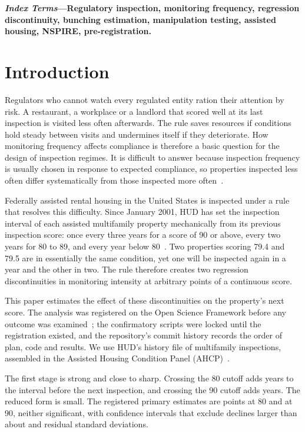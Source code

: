 \documentclass[10pt,twocolumn,letterpaper]{article}
\begin{document}
\vspace{1.0ex}
\noindent\textbf{\textit{Index Terms}---Regulatory inspection, monitoring frequency, regression discontinuity, bunching estimation, manipulation testing, assisted housing, NSPIRE, pre-registration.}

\section{Introduction}
Regulators who cannot watch every regulated entity ration their attention by risk. A restaurant, a workplace or a landlord that scored well at its last inspection is visited less often afterwards. The rule saves resources if conditions hold steady between visits and undermines itself if they deteriorate. How monitoring frequency affects compliance is therefore a basic question for the design of inspection regimes. It is difficult to answer because inspection frequency is usually chosen in response to expected compliance, so properties inspected less often differ systematically from those inspected more often~\cite{gray2011,shimshack2014}.

Federally assisted rental housing in the United States is inspected under a rule that resolves this difficulty. Since January 2001, HUD has set the inspection interval of each assisted multifamily property mechanically from its previous inspection score: once every three years for a score of 90 or above, every two years for 80 to 89, and every year below 80~\cite{fr2000}. Two properties scoring 79.4 and 79.5 are in essentially the same condition, yet one will be inspected again in a year and the other in two. The rule therefore creates two regression discontinuities in monitoring intensity at arbitrary points of a continuous score.

This paper estimates the effect of these discontinuities on the property's next score. The analysis was registered on the Open Science Framework before any outcome was examined~\cite{osfplan}; the confirmatory scripts were locked until the registration existed, and the repository's commit history records the order of plan, code and results. We use HUD's history file of multifamily inspections, assembled in the Assisted Housing Condition Panel (AHCP)~\cite{ahcp,ameen2026}.

The first stage is strong and close to sharp. Crossing the 80 cutoff adds \fsEighty{} years to the interval before the next inspection, and crossing the 90 cutoff adds \fsNinety{} years. The reduced form is small. The registered primary estimates are \jumpEighty{} points at 80 and \jumpNinety{} at 90, neither significant, with confidence intervals that exclude declines larger than about \ciLoSdEighty{} and \ciLoSdNinety{} residual standard deviations.
\end{document}
